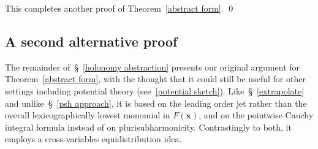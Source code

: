 \documentclass[10pt]{amsart}
\def\SSSS{\S}
\theoremstyle{remark}
\numberwithin{equation}{subsection}
\begin{document}
\medskip

This completes another proof of Theorem~\ref{abstract form}.   \qed


\subsection{A second alternative proof}   \label{initial argument}

The remainder of~\SSSS~\ref{holonomy abstraction} presents our original argument for Theorem~\ref{abstract form}, with the thought that it could still be useful for other settings including potential theory (see~\ref{potential sketch}). Like~\SSSS~\ref{extrapolate} and unlike~\SSSS~\ref{psh approach}, it is based on the leading order jet rather than the overall lexicographically lowest monomial in $F(\mathbf{x})$, and on the pointwise Cauchy integral formula instead of on plurisubharmonicity. Contrastingly to both, it employs a cross-variables equidistribution idea. 
\end{document}
